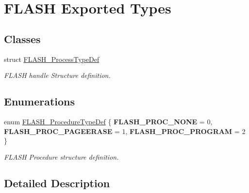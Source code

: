\hypertarget{group___f_l_a_s_h___exported___types}{\section{F\-L\-A\-S\-H Exported Types}
\label{group___f_l_a_s_h___exported___types}
}
\subsection*{Classes}
\begin{DoxyCompactItemize}
\item 
struct \hyperlink{struct_f_l_a_s_h___process_type_def}{F\-L\-A\-S\-H\-\_\-\-Process\-Type\-Def}
\begin{DoxyCompactList}\small\item\em F\-L\-A\-S\-H handle Structure definition. \end{DoxyCompactList}\end{DoxyCompactItemize}
\subsection*{Enumerations}
\begin{DoxyCompactItemize}
\item 
enum \hyperlink{group___f_l_a_s_h___exported___types_ga2b0268387bc11bcab76be9ce7c43eaaf}{F\-L\-A\-S\-H\-\_\-\-Procedure\-Type\-Def} \{ {\bfseries F\-L\-A\-S\-H\-\_\-\-P\-R\-O\-C\-\_\-\-N\-O\-N\-E} = 0, 
{\bfseries F\-L\-A\-S\-H\-\_\-\-P\-R\-O\-C\-\_\-\-P\-A\-G\-E\-E\-R\-A\-S\-E} = 1, 
{\bfseries F\-L\-A\-S\-H\-\_\-\-P\-R\-O\-C\-\_\-\-P\-R\-O\-G\-R\-A\-M} = 2
 \}
\begin{DoxyCompactList}\small\item\em F\-L\-A\-S\-H Procedure structure definition. \end{DoxyCompactList}\end{DoxyCompactItemize}


\subsection{Detailed Description}
